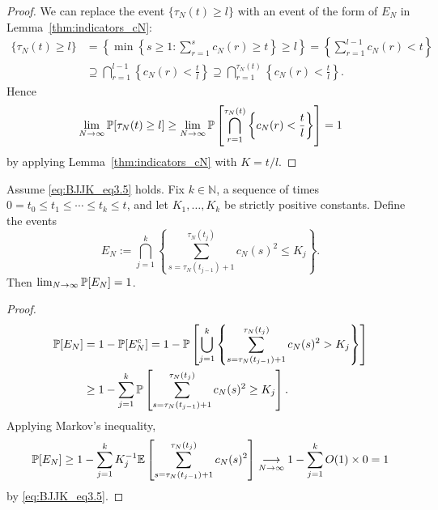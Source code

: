 \begin{proof}
We can replace the event $\{ \tau_N(t) \geq l \}$ with an event of the form of $E_N$ in Lemma~\ref{thm:indicators_cN}:
\begin{align*}
\{ \tau_N(t) \geq l \} 
&= \left\{ \min \left\{ s \geq 1 : \sum_{r=1}^{s} c_N(r) \geq t \right\} \geq l \right\}
= \left\{ \sum_{r=1}^{l-1} c_N(r) < t \right\} \\
&\supseteq \bigcap_{r=1}^{l-1} \left \{ c_N(r) < \frac{t}{l} \right\}
\supseteq \bigcap_{r=1}^{\tau_N(t)} \left \{ c_N(r) < \frac{t}{l} \right\} .
\end{align*}
Hence
\begin{equation*}
\lim_{N\to\infty} \mathbb{P}[ \tau_N(t) \geq l ] 
\geq \lim_{N\to\infty} \mathbb{P}\left[ \bigcap_{r=1}^{\tau_N(t)} 
        \left \{ c_N(r) < \frac{t}{l} \right\} \right]
=1
\end{equation*}
by applying Lemma~\ref{thm:indicators_cN} with $K=t/l$.
\end{proof}


\begin{lemma}\label{thm:indicators_c2}
Assume \eqref{eq:BJJK_eq3.5} holds.
Fix $k\in\mathbb{N}$, a sequence of times $0 = t_0 \leq t_1 \leq \cdots \leq t_k \leq t$, and let $K_1,\dots,K_k$ be strictly positive constants.
Define the events
\begin{equation*}
E_N := \bigcap_{j=1}^k \left\{ \sum_{s=\tau_N(t_{j-1})+1}^{\tau_N(t_j)}
        c_N(s)^2 \leq K_j \right\} .
\end{equation*}
Then $\lim_{N\to\infty} \mathbb{P}[E_N] =1$.
\end{lemma}

\begin{proof}
\begin{align*}
\mathbb{P}[E_N]
&= 1- \mathbb{P}[E_N^c]
= 1- \mathbb{P}\left[ \bigcup_{j=1}^k \left\{ \sum_{s=\tau_N(t_{j-1})+1}
        ^{\tau_N(t_j)} c_N(s)^2 > K_j \right\} \right] \\
&\geq 1- \sum_{j=1}^k \mathbb{P}\left[ \sum_{s=\tau_N(t_{j-1})+1}
        ^{\tau_N(t_j)} c_N(s)^2 \geq K_j \right] .
\end{align*}
Applying Markov's inequality,
\begin{equation*}
\mathbb{P}[E_N]
\geq 1- \sum_{j=1}^k K_j^{-1} \mathbb{E}\left[ \sum_{s=\tau_N(t_{j-1})+1}
        ^{\tau_N(t_j)} c_N(s)^2 \right]
\underset{N\to\infty}{\longrightarrow} 1- \sum_{j=1}^k O(1) \times 0 
= 1
\end{equation*}
by \eqref{eq:BJJK_eq3.5}.
\end{proof}


